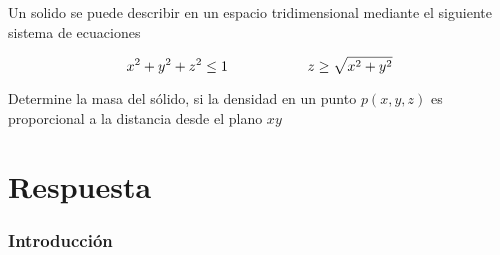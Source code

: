 \item Un solido se puede describir en un espacio tridimensional mediante el siguiente sistema de ecuaciones
        \begin{LARGE}
            \begin{equation*}
                x^2 + y^2 + z^2 \leq 1 \hspace{2 cm} z \geq \sqrt{x^2 + y^2}
            \end{equation*}
        \end{LARGE}
    Determine la masa del sólido, si la densidad en un punto $p(x,y,z)$ es proporcional a la distancia desde el plano $xy$
\section*{Respuesta}
    \subsubsection*{Introducción}